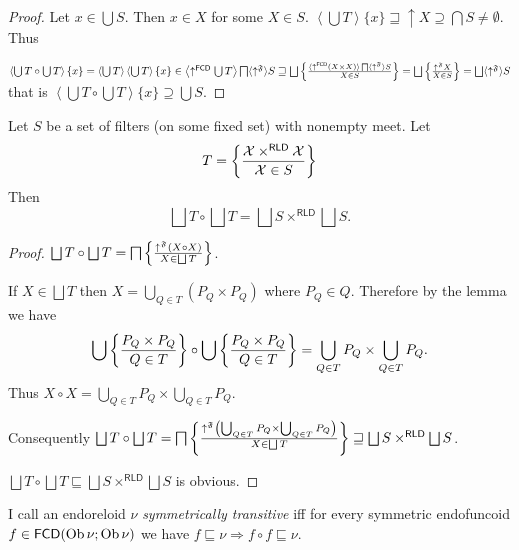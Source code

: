 \begin{proof}
  Let $x \in \bigcup S$. Then $x \in X$ for some $X \in S$. $\left\langle
  \bigcup T \right\rangle \{ x \} \sqsupseteq \uparrow X \supseteq \bigcap S
  \neq \emptyset$. Thus
  
  $\left\langle \bigcup T \circ \bigcup T \right\rangle \{ x \} = \left\langle
  \bigcup T \right\rangle \left\langle \bigcup T \right\rangle \{ x \} \in
  \left\langle \uparrow^{\mathsf{FCD}} \bigcup T \right\rangle
  \bigsqcap \langle \uparrow^{\mathfrak{F}} \rangle S \sqsupseteq \bigsqcup
  \setcond{ \langle \uparrow^{\mathsf{FCD}} (X \times X) \rangle
  \bigsqcap \langle \uparrow^{\mathfrak{F}} \rangle S }{
  X \in S } = \bigsqcup \setcond{ \uparrow^{\mathfrak{F}} X}{X \in S } =
  \bigsqcup \langle
  \uparrow^{\mathfrak{F}} \rangle S$ that is $\left\langle \bigcup T \circ
  \bigcup T \right\rangle \{ x \} \supseteq \bigcup S$.
\end{proof}

\begin{cor}
  Let $S$ be a set of filters (on some fixed set) with nonempty meet. Let
  \[ T = \left\{ \frac{ \mathcal{X} \times^{\mathsf{RLD}} \mathcal{X} }{\mathcal{X} \in S}\right\} \]
  Then
  \[ \bigsqcup T \circ \bigsqcup T = \bigsqcup S \times^{\mathsf{RLD}}
     \bigsqcup S. \]
\end{cor}

\begin{proof}
  $\bigsqcup T \circ \bigsqcup T = \bigsqcap \setcond{ \uparrow^{\mathfrak{F}}
  (X \circ X) }{ X \in \bigsqcup T }$.
  
  If $X \in \bigsqcup T$ then $X = \bigcup_{Q \in T} (P_Q \times P_Q)$ where
  $P_Q \in Q$. Therefore by the lemma we have
  \[ \bigcup \left\{ \frac{ P_Q \times P_Q}{Q \in T}\right\} \circ \bigcup
  \left\{ \frac{ P_Q \times P_Q}{ Q \in T }\right\} = \bigcup_{Q \in T} P_Q \times \bigcup_{Q \in T} P_Q .
  \]
  Thus $X \circ X = \bigcup_{Q \in T} P_Q \times \bigcup_{Q \in T} P_Q$.
  
  Consequently $\bigsqcup T \circ \bigsqcup T = \bigsqcap \setcond{
  \uparrow^{\mathfrak{F}} \left( \bigcup_{Q \in T} P_Q \times \bigcup_{Q \in
  T} P_Q \right)}{X \in \bigsqcup T }
  \sqsupseteq \bigsqcup S \times^{\mathsf{RLD}} \bigsqcup S$.
  
  $\bigsqcup T \circ \bigsqcup T \sqsubseteq \bigsqcup S
  \times^{\mathsf{RLD}} \bigsqcup S$ is obvious.
\end{proof}

\begin{defn}
  I call an endoreloid $\nu$ \emph{symmetrically transitive} iff for every
  symmetric endofuncoid $f \in \mathsf{FCD} (\operatorname{Ob} \nu ; \operatorname{Ob}
  \nu)$ we have $f \sqsubseteq \nu \Rightarrow f \circ f \sqsubseteq \nu$.
\end{defn}

